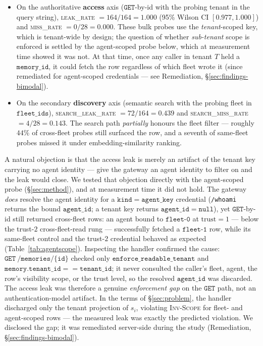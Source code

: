 \documentclass[10pt,twocolumn,letterpaper]{article}
\begin{document}
\begin{itemize}
\item On the authoritative \textbf{access} axis (\(\mathtt{GET}\)-by-id with the probing tenant in the query string), \textsc{leak\_rate} \(= 164/164 = 1.000\) (95\% Wilson CI \([0.977, 1.000]\)) and \textsc{miss\_rate} \(= 0/28 = 0.000\). These bulk probes use the \emph{tenant}-scoped key, which is tenant-wide by design; the question of whether \emph{sub-tenant} scope is enforced is settled by the agent-scoped probe below, which at measurement time showed it was not. At that time, once any caller in tenant \(T\) held a \(\mathtt{memory\_id}\), it could fetch the row regardless of which fleet wrote it (since remediated for agent-scoped credentials --- see Remediation, \S\ref{sec:findings-bimodal}).
\item On the secondary \textbf{discovery} axis (semantic search with the probing fleet in \(\mathtt{fleet\_ids}\)), \textsc{search\_leak\_rate} \(= 72/164 = 0.439\) and \textsc{search\_miss\_rate} \(= 4/28 = 0.143\). The search path \emph{partially} honours the fleet filter --- roughly \(44\%\) of cross-fleet probes still surfaced the row, and a seventh of same-fleet probes missed it under embedding-similarity ranking.
\end{itemize}

A natural objection is that the access leak is merely an artifact of the tenant key carrying no agent identity --- give the gateway an agent identity to filter on and the leak would close. We tested that objection directly with the agent-scoped probe (\S\ref{sec:method}), and at measurement time it did not hold. The gateway \emph{does} resolve the agent identity for a \(\mathtt{kind{=}agent\_key}\) credential (\texttt{/whoami} returns the bound \(\mathtt{agent\_id}\); a tenant key returns \(\mathtt{agent\_id{=}null}\)), yet \(\mathtt{GET}\)-by-id still returned cross-fleet rows: an agent bound to \(\mathtt{fleet\text{-}0}\) at \(\text{trust}=1\) --- below the trust-\(2\) cross-fleet-read rung --- successfully fetched a \(\mathtt{fleet\text{-}1}\) row, while its same-fleet control and the trust-\(2\) credential behaved as expected (Table~\ref{tab:agentscope}). Inspecting the handler confirmed the cause: \(\mathtt{GET\ /memories/\{id\}}\) checked only \(\mathtt{enforce\_readable\_tenant}\) and \(\mathtt{memory.tenant\_id == tenant\_id}\); it never consulted the caller's fleet, agent, the row's visibility scope, or the trust level, so the resolved \(\mathtt{agent\_id}\) was discarded. The access leak was therefore a genuine \emph{enforcement gap} on the \(\mathtt{GET}\) path, not an authentication-model artifact. In the terms of \S\ref{sec:problem}, the handler discharged only the tenant projection of \(s_i\), violating \textsc{Inv-Scope} for fleet- and agent-scoped rows --- the measured leak was exactly the predicted violation. We disclosed the gap; it was remediated server-side during the study (Remediation, \S\ref{sec:findings-bimodal}).
\end{document}
